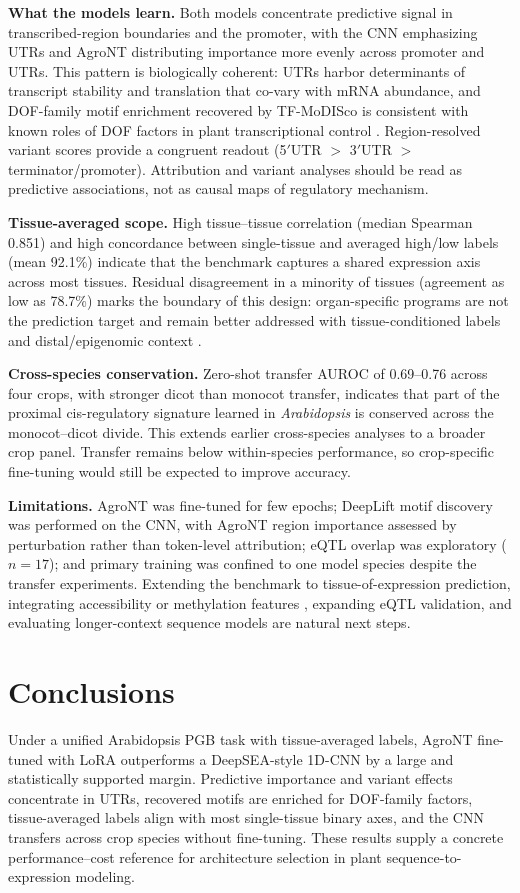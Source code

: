 \documentclass[genes,article,submit,moreauthors,pdftex]{Definitions/mdpi}
\begin{document}
\textbf{What the models learn.} Both models concentrate predictive signal in transcribed-region boundaries and the promoter, with the CNN emphasizing UTRs and AgroNT distributing importance more evenly across promoter and UTRs. This pattern is biologically coherent: UTRs harbor determinants of transcript stability and translation that co-vary with mRNA abundance, and DOF-family motif enrichment recovered by TF-MoDISco is consistent with known roles of DOF factors in plant transcriptional control \cite{peleke2024}. Region-resolved variant scores provide a congruent readout (5$'$UTR $>$ 3$'$UTR $>$ terminator/promoter). Attribution and variant analyses should be read as predictive associations, not as causal maps of regulatory mechanism.

\textbf{Tissue-averaged scope.} High tissue--tissue correlation (median Spearman 0.851) and high concordance between single-tissue and averaged high/low labels (mean 92.1\%) indicate that the benchmark captures a shared expression axis across most tissues. Residual disagreement in a minority of tissues (agreement as low as 78.7\%) marks the boundary of this design: organ-specific programs are not the prediction target and remain better addressed with tissue-conditioned labels and distal/epigenomic context \cite{peleke2024}.

\textbf{Cross-species conservation.} Zero-shot transfer AUROC of 0.69--0.76 across four crops, with stronger dicot than monocot transfer, indicates that part of the proximal cis-regulatory signature learned in \emph{Arabidopsis} is conserved across the monocot--dicot divide. This extends earlier cross-species analyses \cite{peleke2024} to a broader crop panel. Transfer remains below within-species performance, so crop-specific fine-tuning would still be expected to improve accuracy.

\textbf{Limitations.} AgroNT was fine-tuned for few epochs; DeepLift motif discovery was performed on the CNN, with AgroNT region importance assessed by perturbation rather than token-level attribution; eQTL overlap was exploratory ($n=17$); and primary training was confined to one model species despite the transfer experiments. Extending the benchmark to tissue-of-expression prediction, integrating accessibility or methylation features \cite{takou2025}, expanding eQTL validation, and evaluating longer-context sequence models \cite{avsec2021} are natural next steps.

\section{Conclusions}
Under a unified Arabidopsis PGB task with tissue-averaged labels, AgroNT fine-tuned with LoRA outperforms a DeepSEA-style 1D-CNN by a large and statistically supported margin. Predictive importance and variant effects concentrate in UTRs, recovered motifs are enriched for DOF-family factors, tissue-averaged labels align with most single-tissue binary axes, and the CNN transfers across crop species without fine-tuning. These results supply a concrete performance--cost reference for architecture selection in plant sequence-to-expression modeling.
\end{document}
